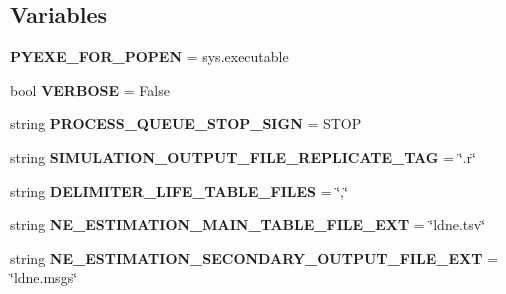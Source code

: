 \subsection*{Variables}
\begin{DoxyCompactItemize}
\item 
{\bfseries P\+Y\+E\+X\+E\+\_\+\+F\+O\+R\+\_\+\+P\+O\+P\+EN} = sys.\+executable\hypertarget{namespacenegui_1_1pgutilities_a39788d2fbbc900829fde21abea8caa81}{}\label{namespacenegui_1_1pgutilities_a39788d2fbbc900829fde21abea8caa81}

\item 
bool {\bfseries V\+E\+R\+B\+O\+SE} = False\hypertarget{namespacenegui_1_1pgutilities_a274572b1b2788c24df3e269bc2a3f1f7}{}\label{namespacenegui_1_1pgutilities_a274572b1b2788c24df3e269bc2a3f1f7}

\item 
string {\bfseries P\+R\+O\+C\+E\+S\+S\+\_\+\+Q\+U\+E\+U\+E\+\_\+\+S\+T\+O\+P\+\_\+\+S\+I\+GN} = \textquotesingle{}S\+T\+OP\textquotesingle{}\hypertarget{namespacenegui_1_1pgutilities_aed436e1fc2eb29963ea30b17e614fd04}{}\label{namespacenegui_1_1pgutilities_aed436e1fc2eb29963ea30b17e614fd04}

\item 
string {\bfseries S\+I\+M\+U\+L\+A\+T\+I\+O\+N\+\_\+\+O\+U\+T\+P\+U\+T\+\_\+\+F\+I\+L\+E\+\_\+\+R\+E\+P\+L\+I\+C\+A\+T\+E\+\_\+\+T\+AG} = \char`\"{}.r\char`\"{}\hypertarget{namespacenegui_1_1pgutilities_aeca2401751f6dc9cd4acbe9765271e20}{}\label{namespacenegui_1_1pgutilities_aeca2401751f6dc9cd4acbe9765271e20}

\item 
string {\bfseries D\+E\+L\+I\+M\+I\+T\+E\+R\+\_\+\+L\+I\+F\+E\+\_\+\+T\+A\+B\+L\+E\+\_\+\+F\+I\+L\+ES} = \char`\"{},\char`\"{}\hypertarget{namespacenegui_1_1pgutilities_ad2dc8f53cd27db093fc7f1227367d833}{}\label{namespacenegui_1_1pgutilities_ad2dc8f53cd27db093fc7f1227367d833}

\item 
string {\bfseries N\+E\+\_\+\+E\+S\+T\+I\+M\+A\+T\+I\+O\+N\+\_\+\+M\+A\+I\+N\+\_\+\+T\+A\+B\+L\+E\+\_\+\+F\+I\+L\+E\+\_\+\+E\+XT} = \char`\"{}ldne.\+tsv\char`\"{}\hypertarget{namespacenegui_1_1pgutilities_aa78d8e8004985b127644b8c985a2b551}{}\label{namespacenegui_1_1pgutilities_aa78d8e8004985b127644b8c985a2b551}

\item 
string {\bfseries N\+E\+\_\+\+E\+S\+T\+I\+M\+A\+T\+I\+O\+N\+\_\+\+S\+E\+C\+O\+N\+D\+A\+R\+Y\+\_\+\+O\+U\+T\+P\+U\+T\+\_\+\+F\+I\+L\+E\+\_\+\+E\+XT} = \char`\"{}ldne.\+msgs\char`\"{}\hypertarget{namespacenegui_1_1pgutilities_adfda5d480a10cf273a287871a5aba972}{}\label{namespacenegui_1_1pgutilities_adfda5d480a10cf273a287871a5aba972}


\end{DoxyCompactItemize}
